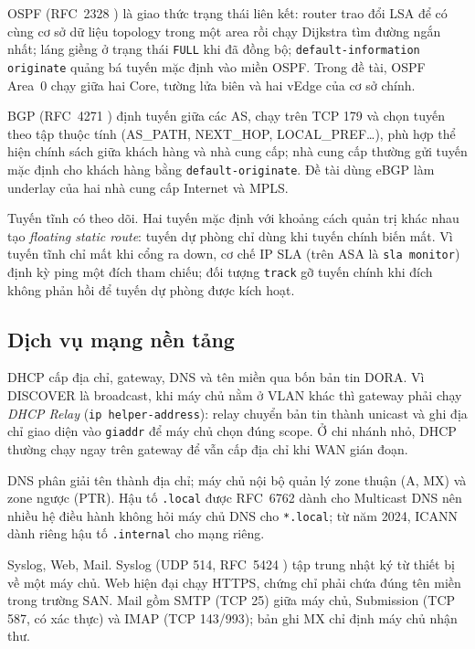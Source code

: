 OSPF (RFC~2328 \citep{rfc2328_ospfv2}) là giao thức trạng thái liên kết: router trao đổi LSA để có cùng cơ sở dữ liệu topology trong một area rồi chạy Dijkstra tìm đường ngắn nhất; láng giềng ở trạng thái \texttt{FULL} khi đã đồng bộ; \texttt{default-information originate} quảng bá tuyến mặc định vào miền OSPF. Trong đề tài, OSPF Area~0 chạy giữa hai Core, tường lửa biên và hai vEdge của cơ sở chính.

BGP (RFC~4271 \citep{rfc4271_bgp4}) định tuyến giữa các AS, chạy trên TCP 179 và chọn tuyến theo tập thuộc tính (AS\_PATH, NEXT\_HOP, LOCAL\_PREF\ldots), phù hợp thể hiện chính sách giữa khách hàng và nhà cung cấp; nhà cung cấp thường gửi tuyến mặc định cho khách hàng bằng \texttt{default-originate}. Đề tài dùng eBGP làm underlay của hai nhà cung cấp Internet và MPLS.

Tuyến tĩnh có theo dõi. Hai tuyến mặc định với khoảng cách quản trị khác nhau tạo \textit{floating static route}: tuyến dự phòng chỉ dùng khi tuyến chính biến mất. Vì tuyến tĩnh chỉ mất khi cổng ra down, cơ chế IP SLA (trên ASA là \texttt{sla monitor}) định kỳ ping một đích tham chiếu; đối tượng \texttt{track} gỡ tuyến chính khi đích không phản hồi để tuyến dự phòng được kích hoạt.

\subsection{Dịch vụ mạng nền tảng}

DHCP \citep{rfc2131_dhcp} cấp địa chỉ, gateway, DNS và tên miền qua bốn bản tin DORA. Vì DISCOVER là broadcast, khi máy chủ nằm ở VLAN khác thì gateway phải chạy \textit{DHCP Relay} (\texttt{ip helper-address}): relay chuyển bản tin thành unicast và ghi địa chỉ giao diện vào \texttt{giaddr} để máy chủ chọn đúng scope. Ở chi nhánh nhỏ, DHCP thường chạy ngay trên gateway để vẫn cấp địa chỉ khi WAN gián đoạn.

DNS \citep{rfc1035_dns} phân giải tên thành địa chỉ; máy chủ nội bộ quản lý zone thuận (A, MX) và zone ngược (PTR). Hậu tố \texttt{.local} được RFC~6762 \citep{rfc6762_mdns} dành cho Multicast DNS nên nhiều hệ điều hành không hỏi máy chủ DNS cho \texttt{*.local}; từ năm 2024, ICANN dành riêng hậu tố \texttt{.internal} cho mạng riêng.

Syslog, Web, Mail. Syslog (UDP 514, RFC~5424 \citep{rfc5424_syslog}) tập trung nhật ký từ thiết bị về một máy chủ. Web hiện đại chạy HTTPS, chứng chỉ phải chứa đúng tên miền trong trường SAN. Mail gồm SMTP (TCP 25) giữa máy chủ, Submission (TCP 587, có xác thực) và IMAP (TCP 143/993); bản ghi MX chỉ định máy chủ nhận thư.

